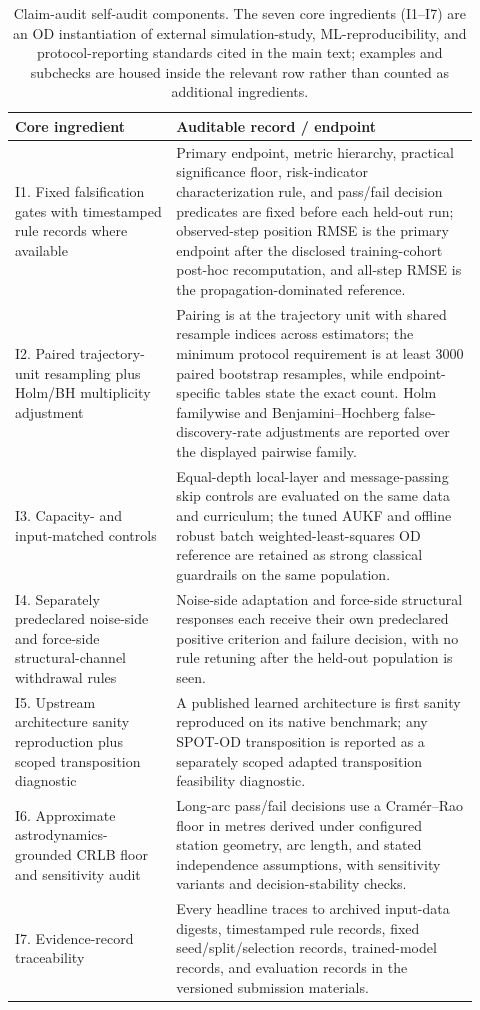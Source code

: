 \documentclass{article}
\begin{document}
\begin{table}[t]
  \centering
  \caption{Claim-audit self-audit components. The seven core ingredients (I1--I7) are an OD instantiation of external simulation-study, ML-reproducibility, and protocol-reporting standards cited in the main text; examples and subchecks are housed inside the relevant row rather than counted as additional ingredients.}
  \label{tab:protocol_prescription}
  \begin{tabular}{p{0.32\linewidth}p{0.60\linewidth}}
    \toprule
    Core ingredient & Auditable record / endpoint \\
    \midrule
    I1. Fixed falsification gates with timestamped rule records where available & Primary endpoint, metric hierarchy, practical significance floor, risk-indicator characterization rule, and pass/fail decision predicates are fixed before each held-out run; observed-step position RMSE is the primary endpoint after the disclosed training-cohort post-hoc recomputation, and all-step RMSE is the propagation-dominated reference. \\
    I2. Paired trajectory-unit resampling plus Holm/BH multiplicity adjustment & Pairing is at the trajectory unit with shared resample indices across estimators; the minimum protocol requirement is at least 3000 paired bootstrap resamples, while endpoint-specific tables state the exact count. Holm familywise and Benjamini--Hochberg false-discovery-rate adjustments are reported over the displayed pairwise family. \\
    I3. Capacity- and input-matched controls & Equal-depth local-layer and message-passing skip controls are evaluated on the same data and curriculum; the tuned AUKF and offline robust batch weighted-least-squares OD reference are retained as strong classical guardrails on the same population. \\
    I4. Separately predeclared noise-side and force-side structural-channel withdrawal rules & Noise-side adaptation and force-side structural responses each receive their own predeclared positive criterion and failure decision, with no rule retuning after the held-out population is seen. \\
    I5. Upstream architecture sanity reproduction plus scoped transposition diagnostic & A published learned architecture is first sanity reproduced on its native benchmark; any SPOT-OD transposition is reported as a separately scoped adapted transposition feasibility diagnostic. \\
    I6. Approximate astrodynamics-grounded CRLB floor and sensitivity audit & Long-arc pass/fail decisions use a Cram\'er--Rao floor in metres derived under configured station geometry, arc length, and stated independence assumptions, with sensitivity variants and decision-stability checks. \\
    I7. Evidence-record traceability & Every headline traces to archived input-data digests, timestamped rule records, fixed seed/split/selection records, trained-model records, and evaluation records in the versioned submission materials. \\
    \bottomrule
  \end{tabular}
\end{table}
\end{document}

